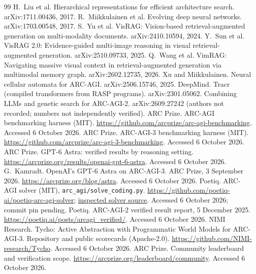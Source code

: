 \documentclass[11pt]{article}
\begin{document}
\begin{thebibliography}{99}
 H.~Liu et al. Hierarchical representations for efficient architecture search. arXiv:1711.00436, 2017.
 R.~Miikkulainen et al. Evolving deep neural networks. arXiv:1703.00548, 2017.
 S.~Yu et al. VisRAG: Vision-based retrieval-augmented generation on multi-modality documents. arXiv:2410.10594, 2024.
 Y.~Sun et al. VisRAG 2.0: Evidence-guided multi-image reasoning in visual retrieval-augmented generation. arXiv:2510.09733, 2025.
 Q.~Wang et al. VimRAG: Navigating massive visual context in retrieval-augmented generation via multimodal memory graph. arXiv:2602.12735, 2026.
 Xu and Miikkulainen. Neural cellular automata for ARC-AGI. arXiv:2506.15746, 2025.
 DeepMind. Tracr (compiled transformers from RASP programs). arXiv:2301.05062.
 Combining LLMs and genetic search for ARC-AGI-2. arXiv:2609.27242 (authors not recorded; numbers not independently verified).
 ARC Prize. ARC-AGI benchmarking harness (MIT).
\url{https://github.com/arcprize/arc-agi-benchmarking}. Accessed 6 October 2026.
 ARC Prize. ARC-AGI-3 benchmarking harness (MIT).
\url{https://github.com/arcprize/arc-agi-3-benchmarking}. Accessed 6 October 2026.
 ARC Prize. GPT-6 Astra: verified results by reasoning setting.
\url{https://arcprize.org/results/openai-gpt-6-astra}. Accessed 6 October 2026.
 G.~Kamradt. OpenAI's GPT-6 Astra on ARC-AGI-3. ARC Prize, 3 September 2026.
\url{https://arcprize.org/blog/astra}. Accessed 6 October 2026.
 Poetiq. ARC-AGI solver (MIT), \texttt{arc\_agi/solve\_coding.py}.
\url{https://github.com/poetiq-ai/poetiq-arc-agi-solver};
\href{https://raw.githubusercontent.com/poetiq-ai/poetiq-arc-agi-solver/main/arc_agi/solve_coding.py}{inspected solver source}.
Accessed 6 October 2026; commit pin pending.
 Poetiq. ARC-AGI-2 verified result report, 5 December 2025.
\url{https://poetiq.ai/posts/arcagi_verified/}. Accessed 6 October 2026.
 NIMI Research. Tycho: Active Abstraction with Programmatic World Models for
ARC-AGI-3. Repository and public scorecards (Apache-2.0).
\url{https://github.com/NIMI-research/Tycho}. Accessed 6 October 2026.
 ARC Prize. Community leaderboard and verification scope.
\url{https://arcprize.org/leaderboard/community}. Accessed 6 October 2026.

\end{thebibliography}
\end{document}
